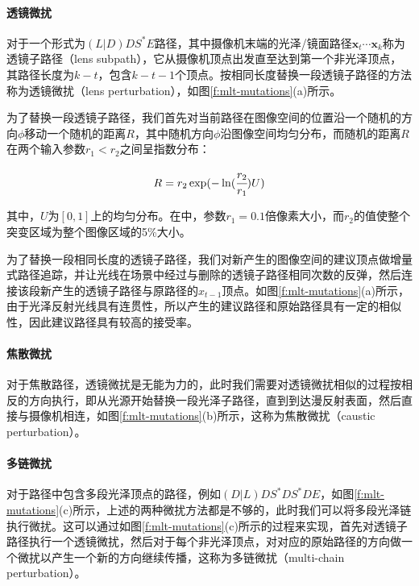 \paragraph{透镜微扰}
对于一个形式为$(L|D)DS^{*}E$路径，其中摄像机末端的光泽/镜面路径$\mathbf{x}_t\cdots\mathbf{x}_k$称为透镜子路径（lens subpath），它从摄像机顶点出发直至达到第一个非光泽顶点，其路径长度为$k-t$，包含$k-t-1$个顶点。按相同长度替换一段透镜子路径的方法称为透镜微扰（lens perturbation），如图\ref{f:mlt-mutations}(a)所示。

为了替换一段透镜子路径，我们首先对当前路径在图像空间的位置沿一个随机的方向$\phi$移动一个随机的距离$R$，其中随机方向$\phi$沿图像空间均匀分布，而随机的距离$R$在两个输入参数$r_1<r_2$之间呈指数分布：

\begin{equation}
	R=r_2\exp(-\ln(\cfrac{r_2}{r_1})U)
\end{equation}

\noindent 其中，$U$为$[0,1]$上的均匀分布。在\cite{a:MetropolisLightTransport}中，参数$r_1=0.1$倍像素大小，而$r_2$的值使整个突变区域为整个图像区域的5\%大小。

为了替换一段相同长度的透镜子路径，我们对新产生的图像空间的建议顶点做增量式路径追踪，并让光线在场景中经过与删除的透镜子路径相同次数的反弹，然后连接该段新产生的透镜子路径与原路径的$x_{t-1}$顶点。如图\ref{f:mlt-mutations}(a)所示，由于光泽反射光线具有连贯性，所以产生的建议路径和原始路径具有一定的相似性，因此建议路径具有较高的接受率。




\paragraph{焦散微扰}
对于焦散路径，透镜微扰是无能为力的，此时我们需要对透镜微扰相似的过程按相反的方向执行，即从光源开始替换一段光泽子路径，直到到达漫反射表面，然后直接与摄像机相连，如图\ref{f:mlt-mutations}(b)所示，这称为焦散微扰（caustic perturbation）。



\paragraph{多链微扰}
对于路径中包含多段光泽顶点的路径，例如$(D|L)DS^{*}DS^{*}DE$，如图\ref{f:mlt-mutations}(c)所示，上述的两种微扰方法都是不够的，此时我们可以将多段光泽链执行微扰。这可以通过如图\ref{f:mlt-mutations}(c)所示的过程来实现，首先对透镜子路径执行一个透镜微扰，然后对于每个非光泽顶点，对对应的原始路径的方向做一个微扰以产生一个新的方向继续传播，这称为多链微扰（multi-chain perturbation）。





